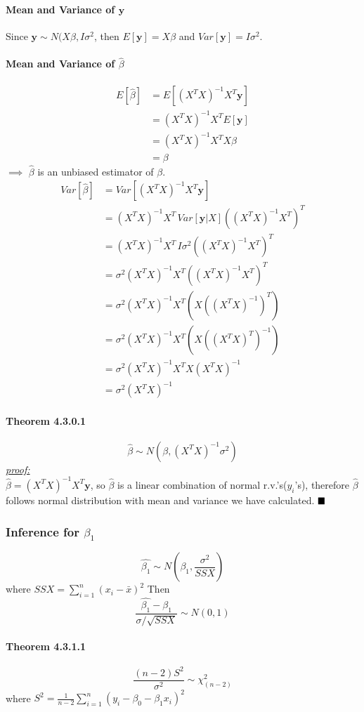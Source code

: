 \documentclass[11pt]{article}
\newcommand{\tb}[1]{\textbf{#1}}
\newcommand{\proof}[0]{\textit{\underline{proof:} }}
\newcommand{\vy}[0]{\tb{y}}
\newcommand{\qed}[0]{$\hfill\blacksquare$}
\begin{document}
\paragraph{Mean and Variance of $\vy$}
Since $\vy \sim N(X\beta, I\sigma^2$, then $E[\vy] = X\beta$ and $Var[\vy] = I\sigma^2$.
\paragraph{Mean and Variance of $\hat{\beta}$}
\begin{align*}
    E[\hat{\beta}] &= E[(X^TX)^{-1}X^T\vy]\\
    &= (X^TX)^{-1}X^TE[\vy]\\
    &= (X^TX)^{-1}X^TX\beta \\
    &= \beta
\end{align*}
$\implies$ $\hat{\beta}$ is an unbiased estimator of $\beta$.
\begin{align*}
    Var[\hat{\beta}] &= Var[(X^TX)^{-1}X^T\vy]\\
    &= (X^TX)^{-1}X^T \, Var[\vy|X]((X^TX)^{-1}X^T)^T\\
    &= (X^TX)^{-1}X^T \, I\sigma^2 ((X^TX)^{-1}X^T)^T \\
    &= \sigma^2 (X^TX)^{-1}X^T((X^TX)^{-1}X^T)^T \\
    &= \sigma^2 (X^TX)^{-1}X^T(X((X^TX)^{-1})^T)\\
    &= \sigma^2 (X^TX)^{-1}X^T(X((X^TX)^{T})^{-1})\\
    &= \sigma^2 (X^TX)^{-1}X^TX(X^TX)^{-1}\\
    &= \sigma^2 (X^TX)^{-1}
\end{align*}
\paragraph{Theorem 4.3.0.1} $$\hat{\beta} \sim N(\beta, (X^TX)^{-1}\sigma^2)$$
\proof\\
$\hat{\beta} = (X^TX)^{-1}X^T\vy$, so $\hat{\beta}$ is a linear combination of normal r.v.'s($y_i$'s), therefore $\hat{\beta}$ follows normal distribution with mean and variance we have calculated. \qed
\subsubsection{Inference for $\beta_1$}
$$\hat{\beta_1} \sim N(\beta_1, \frac{\sigma^2}{SSX})$$
where $SSX = \sum_{i=1}^n(x_i - \bar{x})^2$
Then $$\frac{\hat{\beta_1} - \beta_1}{\sigma/\sqrt{SSX}} \sim N(0,1)$$
\paragraph{Theorem 4.3.1.1}
$$\frac{(n-2)S^2}{\sigma^2} \sim \chi^2_{(n-2)}$$
where $S^2 = \frac{1}{n-2}\sum_{i=1}^n(y_i - \beta_0 - \beta_1x_i)^2$
\end{document}
